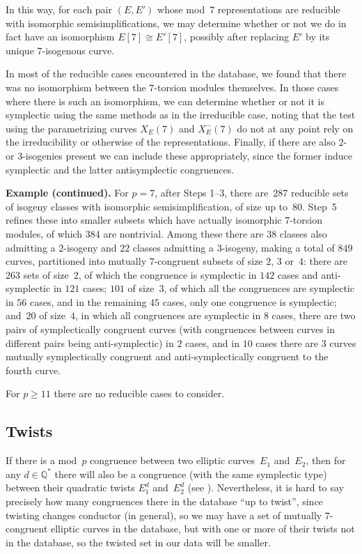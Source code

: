 \documentclass[12pt, reqno]{amsart}
\newcommand{\Q}{\mathbb{Q}}
\numberwithin{equation}{section}
\theoremstyle{definition}
\theoremstyle{remark}
\begin{document}

In this way, for each pair $(E,E')$ whose 
mod~$7$ representations
are reducible with isomorphic semisimplifications, we may determine
whether or not we do in fact have an isomorphism $E[7]\cong E'[7]$,
possibly after replacing $E'$ by its unique $7$-isogenous curve.

In most of the reducible cases encountered in the database, we found
that there was no isomorphism between the $7$-torsion modules
themselves.  In those cases where there is such an isomorphism, we can
determine whether or not it is symplectic using the same methods as in
the irreducible case, noting that the test using the parametrizing
curves $X_E(7)$ and $X_E^-(7)$ do not at any point rely on the
irreducibility or otherwise of the representations.  Finally, if there
are also $2$-{} or $3$-isogenies present we can include these
appropriately, since the former induce symplectic and the latter
antisymplectic congruences.

{\bf Example (continued).} For $p=7$, after Steps 1--3, there
are~$287$ reducible sets of isogeny classes with isomorphic
semisimplification, of size up to~$80$.  Step~5 refines these into
smaller subsets which have actually isomorphic $7$-torsion modules, of
which $384$ are nontrivial.  Among these there are $38$ classes also
admitting a $2$-isogeny and $22$ classes admitting a $3$-isogeny,
making a total of $849$ curves, partitioned into mutually
$7$-congruent subsets of size $2$, $3$ or~$4$: there are $263$ sets of
size~$2$, of which the congruence is symplectic in $142$ cases and
anti-symplectic in $121$ cases; $101$ of size~$3$, of which all the
congruences are symplectic in $56$ cases, and in the remaining $45$
cases, only one congruence is symplectic; and~$20$ of size~$4$, in
which all congruences are symplectic in $8$ cases, there are two pairs
of symplectically congruent curves (with congruences between curves in
different pairs being anti-symplectic) in $2$ cases, and in $10$ cases
there are $3$ curves mutually symplectically congruent and
anti-symplectically congruent to the fourth curve.

For $p\ge11$ there are no reducible cases to consider.

\subsection{Twists}
If there is a mod~$p$ congruence between two elliptic curves~$E_1$
and~$E_2$, then for any $d\in\Q^*$ there will also be a congruence
(with the same symplectic type) between their quadratic twists
$E_1^d$ and~$E_2^d$ (see \cite[Lemma~11]{FKSym}).
Nevertheless, it is hard to say precisely how many congruences there
in the database ``up to twist'', since twisting changes conductor (in
general), so we may have a set of mutually $7$-congruent elliptic
curves in the database, but with one or more of their twists not in
the database, so the twisted set in our data will be smaller.
\end{document}
